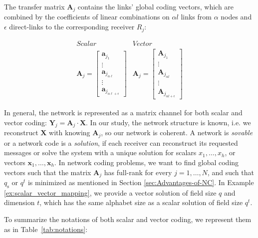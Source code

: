 The transfer matrix $\boldsymbol{A}_{j}$ contains the links' global
coding vectors, which are combined by the coefficients of linear combinations
on $\alpha l$ links from $\alpha$ nodes and $\epsilon$ direct-links
to the corresponding receiver $R_{j}$:

\[
\begin{array}{c|c}
Scalar & Vector\\
\boldsymbol{A}_{j}=\left[\begin{array}{c}
\boldsymbol{a}_{j_{1}}\\
\vdots\\
\boldsymbol{a}_{j_{\alpha\ell}}\\
\vdots\\
\boldsymbol{a}_{j_{\alpha\ell+\epsilon}}
\end{array}\right] & \boldsymbol{A}_{j}=\left[\begin{array}{c}
\boldsymbol{A}_{j_{1}}\\
\vdots\\
\boldsymbol{A}_{j_{\alpha l}}\\
\vdots\\
\boldsymbol{A}_{j_{\alpha l+\epsilon}}
\end{array}\right]
\end{array}
\]

In general, the network is represented as a matrix channel for both
scalar and vector coding: $\boldsymbol{Y}_{j}=\boldsymbol{A}_{j}\cdot\boldsymbol{X}$.
In our study, the network structure is known, i.e. we reconstruct
$\boldsymbol{X}$ with knowing $\boldsymbol{A}_{j}$, so our network
is coherent. A network is \textit{sovable} or a network code is a
\textit{solution}, if each receiver can reconstruct its requested
messages or solve the system with a unique solution for scalars $x_{1},\ldots,x_{h}$,
or vectors $\boldsymbol{x}_{1},\ldots,\boldsymbol{x}_{h}$. In network
coding problems, we want to find global coding vectors such that the
matrix $\boldsymbol{A}_{j}$ has full-rank for every $j=1,\ldots,N$,
and such that $q_{\mathrm{s}}$ or $q^{t}$ is minimized as mentioned
in Section \ref{sec:Advantages-of-NC}. In Example \ref{ex:scalar_vector_mapping},
we provide a vector solution of field size $q$ and dimension $t$,
which has the same alphabet size as a scalar solution of field size
$q^{t}$.

To summarize the notations of both scalar and vector coding, we represent
them as in Table~\ref{tab:notations}:

